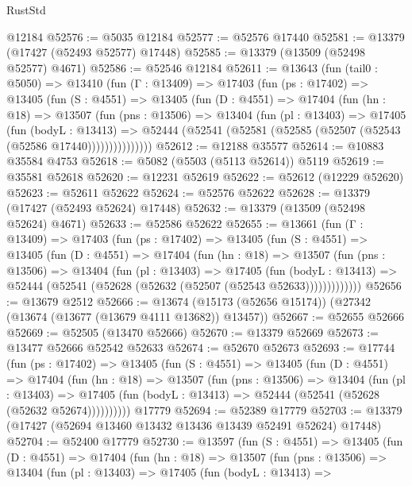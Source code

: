 \begin{lexlean}{RustStd}
\begin{coremodule}
    @12184
@52576 := @5035 @12184
@52577 := @52576 @17440
@52581 := @13379 (@17427 (@52493 @52577) @17448)
@52585 := @13379 (@13509 (@52498 @52577) @4671)
@52586 := @52546 @12184
@52611 := @13643
    (fun (tail0 : @5050) =>
    @13410
      (fun (Γ : @13409) =>
      @17403
        (fun (ps : @17402) =>
        @13405
          (fun (S : @4551) =>
          @13405
            (fun (D : @4551) =>
            @17404
              (fun (hn : @18) =>
              @13507
                (fun (pns : @13506) =>
                @13404
                  (fun (pl : @13403) =>
                  @17405
                    (fun (bodyL : @13413) =>
                    @52444 (@52541 (@52581 (@52585 (@52507 (@52543 (@52586 @17440)))))))))))))))
@52612 := @12188 @35577
@52614 := @10883 @35584 @4753
@52618 := @5082 (@5503 (@5113 @52614)) @5119
@52619 := @35581 @52618
@52620 := @12231 @52619
@52622 := @52612 (@12229 @52620)
@52623 := @52611 @52622
@52624 := @52576 @52622
@52628 := @13379 (@17427 (@52493 @52624) @17448)
@52632 := @13379 (@13509 (@52498 @52624) @4671)
@52633 := @52586 @52622
@52655 := @13661
    (fun (Γ : @13409) =>
    @17403
      (fun (ps : @17402) =>
      @13405
        (fun (S : @4551) =>
        @13405
          (fun (D : @4551) =>
          @17404
            (fun (hn : @18) =>
            @13507
              (fun (pns : @13506) =>
              @13404
                (fun (pl : @13403) =>
                @17405
                  (fun (bodyL : @13413) =>
                  @52444 (@52541 (@52628 (@52632 (@52507 (@52543 @52633)))))))))))))
@52656 := @13679 @2512
@52666 := @13674 (@15173 (@52656 @15174)) (@27342 (@13674 (@13677 (@13679 @4111 @13682)) @13457))
@52667 := @52655 @52666
@52669 := @52505 (@13470 @52666)
@52670 := @13379 @52669
@52673 := @13477 @52666 @52542 @52633
@52674 := @52670 @52673
@52693 := @17744
    (fun (ps : @17402) =>
    @13405
      (fun (S : @4551) =>
      @13405
        (fun (D : @4551) =>
        @17404
          (fun (hn : @18) =>
          @13507
            (fun (pns : @13506) =>
            @13404
              (fun (pl : @13403) =>
              @17405 (fun (bodyL : @13413) => @52444 (@52541 (@52628 (@52632 @52674))))))))))
    @17779
@52694 := @52389 @17779
@52703 := @13379 (@17427 (@52694 @13460 @13432 @13436 @13439 @52491 @52624) @17448)
@52704 := @52400 @17779
@52730 := @13597
    (fun (S : @4551) =>
    @13405
      (fun (D : @4551) =>
      @17404
        (fun (hn : @18) =>
        @13507
          (fun (pns : @13506) =>
          @13404
            (fun (pl : @13403) =>
            @17405
              (fun (bodyL : @13413) =>

\end{coremodule}
\end{lexlean}
